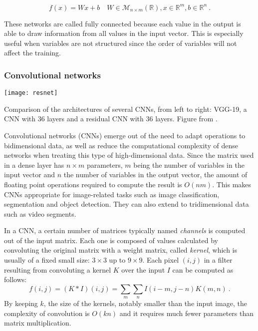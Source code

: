 \begin{equation}
    f(x)=Wx + b\quad W\in \mathcal M_{n\times m}(\mathbb R), x\in\mathbb R^m, b\in\mathbb R^n~.
\end{equation}

These networks are called fully connected because each value in the output is able to draw information from all values in the input vector. This is especially useful when variables are not structured since the order of variables  will not affect the training.

\subsubsection{Convolutional networks}

\begin{marginfigure}
    \texttt{[image: resnet]}
    \caption{\label{fig:resnet}Comparison of the architectures of several CNNs, from left to right: VGG-19, a CNN with 36 layers and a residual CNN with 36 layers. Figure from \cite{he2016deep}.}
\end{marginfigure}


Convolutional networks (CNNs) emerge out of the need to adapt operations to bidimensional data, as well as reduce the computational complexity of dense networks when treating this type of high-dimensional data. Since the matrix used in a dense layer has $n\times m$ parameters, $m$ being the number of variables in the input vector and $n$ the number of variables in the output vector, the amount of floating point operations required to compute the result is $O\left(nm\right)$. This makes CNNs appropriate for image-related tasks such as image classification, segmentation and object detection. They can also extend to tridimensional data such as video segments.

In a CNN, a certain number of matrices typically named \textit{channels} is computed out of the input matrix. Each one is composed of values calculated by convoluting the original matrix with a weight matrix, called \textit{kernel}, which is usually of a fixed small size: $3\times 3$ up to $9\times 9$. Each pixel $(i, j)$ in a filter resulting from convoluting a kernel $K$ over the input $I$ can be computed as follows:
\begin{equation}
    f(i,j)=\left(K\ast I\right)(i,j)=\sum_{m}\sum_{n}I(i-m,j-n)K(m,n)~.
\end{equation}
By keeping $k$, the size of the kernels, notably smaller than the input image, the complexity of convolution is $O(kn)$ and it requires much fewer parameters than matrix multiplication.

